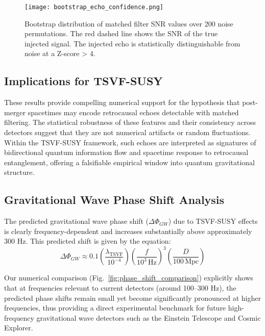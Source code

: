 \documentclass[twocolumn,superscriptaddress,floatfix]{revtex4-2}
\begin{document}
\begin{figure}[htbp]
\centering
\texttt{[image: bootstrap\_echo\_confidence.png]}
\caption{Bootstrap distribution of matched filter SNR values over 200 noise permutations. The red dashed line shows the SNR of the true injected signal. The injected echo is statistically distinguishable from noise at a Z-score > 4.}
\label{fig:bootstrap_confidence}
\end{figure}

\subsection{Implications for TSVF-SUSY}

These results provide compelling numerical support for the hypothesis that post-merger spacetimes may encode retrocausal echoes detectable with matched filtering. The statistical robustness of these features and their consistency across detectors suggest that they are not numerical artifacts or random fluctuations. Within the TSVF-SUSY framework, such echoes are interpreted as signatures of bidirectional quantum information flow and spacetime response to retrocausal entanglement, offering a falsifiable empirical window into quantum gravitational structure.




\subsection{Gravitational Wave Phase Shift Analysis}\label{subsec:gw_phase_shift_analysis}
The predicted gravitational wave phase shift ($\Delta \Phi_{GW}$) due to TSVF-SUSY effects is clearly frequency-dependent and increases substantially above approximately 300 Hz. This predicted shift is given by the equation:
\begin{equation}\label{eq:gw_phase_shift}
\Delta \Phi_{GW} \approx 0.1 \left(\frac{\lambda_{\text{TSVF}}}{10^{-4}}\right) \left(\frac{f}{10^{3}\,\text{Hz}}\right)^3 \left(\frac{D}{100\,\text{Mpc}}\right)
\end{equation}

Our numerical comparison (Fig.~\ref{fig:phase_shift_comparison}) explicitly shows that at frequencies relevant to current detectors (around 100--300 Hz), the predicted phase shifts remain small yet become significantly pronounced at higher frequencies, thus providing a direct experimental benchmark for future high-frequency gravitational wave detectors such as the Einstein Telescope and Cosmic Explorer.
\end{document}
